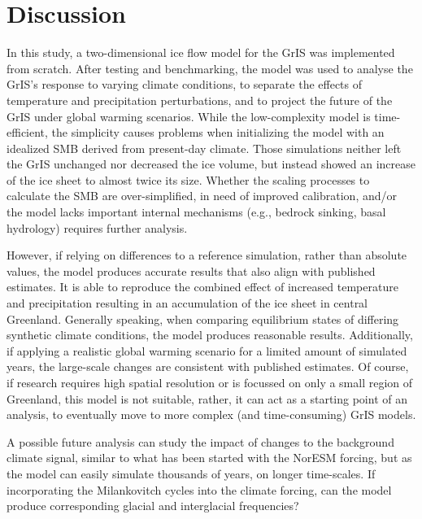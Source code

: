 \section{Discussion}


In this study, a two-dimensional ice flow model for the GrIS was implemented from scratch. After testing and benchmarking, the model was used to analyse the GrIS's response to varying climate conditions, to separate the effects of temperature and precipitation perturbations, and to project the future of the GrIS under global warming scenarios. While the low-complexity model is time-efficient, the simplicity causes problems when initializing the model with an idealized SMB derived from present-day climate. Those simulations neither left the GrIS unchanged nor decreased the ice volume, but instead showed an increase of the ice sheet to almost twice its size. Whether the scaling processes to calculate the SMB are over-simplified, in need of improved calibration, and/or the model lacks important internal mechanisms (e.g., bedrock sinking, basal hydrology) requires further analysis. 

However, if relying on differences to a reference simulation, rather than absolute values, the model produces accurate results that also align with published estimates. It is able to reproduce the combined effect of increased temperature and precipitation resulting in an accumulation of the ice sheet in central Greenland. Generally speaking, when comparing equilibrium states of differing synthetic climate conditions, the model produces reasonable results. Additionally, if applying a realistic global warming scenario for a limited amount of simulated years, the large-scale changes are consistent with published estimates. Of course, if research requires high spatial resolution or is focussed on only a small region of Greenland, this model is not suitable, rather, it can act as a starting point of an analysis, to eventually move to more complex (and time-consuming) GrIS models.

A possible future analysis can study the impact of changes to the background climate signal, similar to what has been started with the NorESM forcing, but as the model can easily simulate thousands of years, on longer time-scales. If incorporating the Milankovitch cycles into the climate forcing, can the model produce corresponding glacial and interglacial frequencies?    

